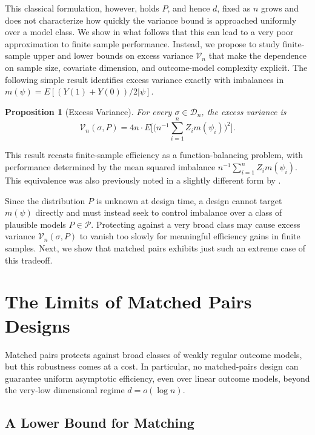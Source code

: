 \documentclass[letterpaper,12pt]{article}
\newtheorem{prop}[thm]{Proposition}
\theoremstyle{definition}
\numberwithin{equation}{section}
\newcommand{\mc}{\mathcal}
\begin{document}
This classical formulation, however, holds $P$, and hence $d$, fixed as $n$ grows and does not characterize how quickly the variance bound is approached uniformly over a model class.
We show in what follows that this can lead to a very poor approximation to finite sample performance. 
Instead, we propose to study finite-sample upper and lower bounds on excess variance $\mc V_n$ that make the dependence on sample size, covariate dimension, and outcome-model complexity explicit.
The following simple result identifies excess variance exactly with imbalances in $m(\psi) = E[(Y(1) + Y(0))/2 | \psi]$.

\begin{prop}[Excess Variance]\label{proposition:variance-decomposition}
For every $\sigma\in\mathcal D_n$, the excess variance is 
\begin{equation}\label{equation:variance-decomposition}
\mc V_n(\sigma,P) = 4n \cdot E \bigg[  \Big( n^{-1} \sum_{i=1}^nZ_im(\psi_i) \Big)^2  \bigg].
\end{equation}
\end{prop}
This result recasts finite-sample efficiency as a function-balancing problem, with performance determined by the mean squared imbalance $n^{-1}\sum_{i=1}^nZ_im(\psi_i)$.
This equivalence was also previously noted in a slightly different form by \citet{kallus2018}.

Since the distribution $P$ is unknown at design time, a design cannot target $m(\psi)$ directly and must instead seek to control imbalance over a class of plausible models $P \in \mc P$.
Protecting against a very broad class may cause excess variance $\mc V_n(\sigma,P)$ to vanish too slowly for meaningful efficiency gains in finite samples.
Next, we show that matched pairs exhibits just such an extreme case of this tradeoff.


\section{The Limits of Matched Pairs Designs}\label{section:matching}

Matched pairs protects against broad classes of weakly regular outcome models, but this robustness comes at a cost.
In particular, no matched-pairs design can guarantee uniform asymptotic efficiency, even over linear outcome models, beyond the very-low dimensional regime $d=o(\log n)$.

\subsection{A Lower Bound for Matching}\label{subsection:matching-lower-bound}
\end{document}
